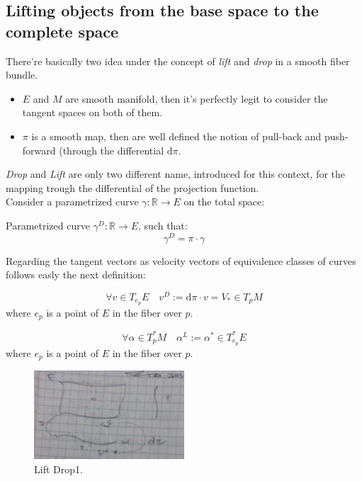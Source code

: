 \documentclass[a4paper,12pt]{scrartcl}    %
\begin{document}
\subsection{Lifting objects from the base space to the complete space}
There're basically two idea under the concept of \emph{lift} and \emph{drop} in a smooth fiber bundle.
\begin{itemize}
	\item $E$ and $M$ are smooth manifold, then it's perfectly legit to consider the tangent spaces on both of them.
	\item $\pi$ is a smooth map, then are well defined the notion of pull-back and push-forward (through the differential $\textrm{d}\pi$. 
\end{itemize}

\emph{Drop} and \emph{Lift} are only two different name, introduced for this context, for the mapping trough the differential of the projection function.
\\
Consider a parametrized curve $ \gamma: \mathbb{R}\rightarrow E$ on the total space:
\begin{definition}
Parametrized curve $\gamma^{D}: \mathbb{R}\rightarrow E$, such that:
\begin{displaymath}
\gamma^{D} = \pi \cdot \gamma
\end{displaymath}
\end{definition}
Regarding the tangent vectors as velocity vectors of equivalence classes of curves follows easly the next definition:
\begin{definition}
\begin{displaymath}
\forall v \in T_{e_{p}}E \quad v^D := \textrm{d}\pi \cdot v = V_{\ast} \in T_{p}M
\end{displaymath}
where $e_p$ is a point of $E$ in the fiber over $p$.
\end{definition}

\begin{definition}
\begin{displaymath}
\forall \alpha \in T_p^*M \quad \alpha^L := \alpha^{*} \in T_{e_{p}}^*E
\end{displaymath}
where $e_p$ is a point of $E$ in the fiber over $p$.
\end{definition}

\begin{figure}[h!]
  \caption{Lift Drop1.}
  	\includegraphics[width=0.5\textwidth]{TempPictures/LiftDrop1.jpg}
  \centering
\end{figure}
\end{document}
